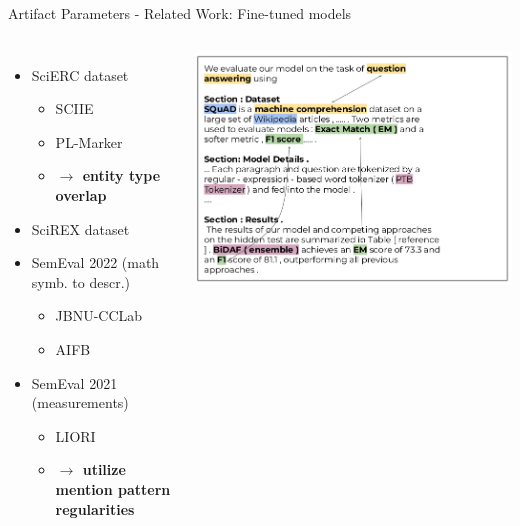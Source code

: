 \documentclass[en,16:9,smallfoot]{sdqbeamer}
\begin{document}
   \begin{frame}{Artifact Parameters - Related Work: Fine-tuned models}
   \begin{columns}
           \begin{itemize}
               \item SciERC dataset %
                   \begin{itemize}
                       \item SCIIE~\cite{luan2018scierc}
                       \item PL-Marker~\cite{Ye2022}
                       \item \textbf{$\rightarrow$ entity type overlap}
                   \end{itemize}
               \item {\color{contextgrey}SciREX dataset} %
               \item {\color{contextgrey}SemEval 2022 (math symb. to descr.)}
                   \begin{itemize}
                       \item {\color{contextgrey}JBNU-CCLab~\cite{Lee2022}}
                       \item {\color{contextgrey}AIFB~\cite{Popovic2022}}
                   \end{itemize}
               \item SemEval 2021 (measurements)
                   \begin{itemize}
                       \item LIORI~\cite{Davletov2021}
                       \item \textbf{$\rightarrow$ utilize mention pattern regularities}
                   \end{itemize}
           \end{itemize}
           \begin{center}\includegraphics[width=\textwidth]{imgs/scirex}\end{center}

\end{columns}
\end{frame}
\end{document}
